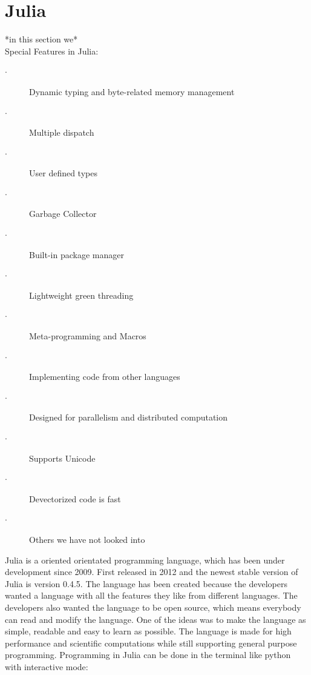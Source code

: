 \documentclass[a4paper, 11pt, titlepage]{article}
\begin{document}
\section{Julia}
*in this section we* \\
Special Features in Julia:
\begin{description}
	\item[$\cdot$] Dynamic typing and byte-related memory management
	\item[$\cdot$] Multiple dispatch
	\item[$\cdot$] User defined types
	\item[$\cdot$] Garbage Collector
	\item[$\cdot$] Built-in package manager
	\item[$\cdot$] Lightweight green threading
	\item[$\cdot$] Meta-programming and Macros
	\item[$\cdot$] Implementing code from other languages
	\item[$\cdot$] Designed for parallelism and distributed computation
	\item[$\cdot$] Supports Unicode
	\item[$\cdot$] Devectorized code is fast
	\item[$\cdot$] Others we have not looked into
\end{description}
Julia is a oriented orientated programming language, which has been under development since 2009. First released in 2012 and the newest stable version of Julia is version 0.4.5.  The language has been created because the developers wanted a language with all the features they like from different languages. The developers also wanted the language to be open source, which means everybody can read and modify the language. One of the ideas was to make the language as simple, readable and easy to learn as possible. The language is made for high performance and scientific computations while still supporting general purpose programming. 
Programming in Julia can be done in the terminal like python with interactive mode:
\end{document}
